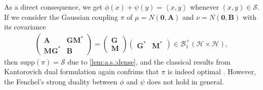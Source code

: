 \documentclass[noinfoline]{imsart}\setcounter{tocdepth}{2}
\newcommand{\m}[1]{\mathbf{#1}} %
\renewcommand{\c}[1]{\mathcal{#1}} %
\newcommand{\innpr}[2]{{\left\langle {#1},{#2}\right\rangle}} %
\theoremstyle{plain}
\begin{document}
As a direct consequence, we get $\phi(x) + \psi(y) = \innpr{x}{y}$ whenever $(x, y) \in \c{S}$. If we consider the Gaussian coupling $\pi$ of $\mu = N(\m{0}, \m{A})$ and $\nu = N(\m{0}, \m{B})$ with its covariance
\begin{align*}
    \begin{pmatrix}
    \m{A} & \m{G} \m{M}^{*} \\
    \m{M} \m{G}^{*} & \m{B}
    \end{pmatrix} = 
    \begin{pmatrix}
    \m{G} \\
    \m{M}
    \end{pmatrix}
    \begin{pmatrix}
    \m{G}^{*} & \m{M}^{*}
    \end{pmatrix}
    \in \c{B}_{1}^{+}(\c{H} \times \c{H}),
\end{align*}
then $\text{supp}(\pi) = \c{S}$ due to \cref{lem:a.s.:dense}, and the classical results from Kantorovich dual formulation again confrims that $\pi$ is indeed optimal \cite{villani2008optimal, ambrosio2008gradient}. However, the Fenchel's strong duality \cite{rockafellar1970convex} between $\phi$ and $\psi$ does not hold in general.
\end{document}
